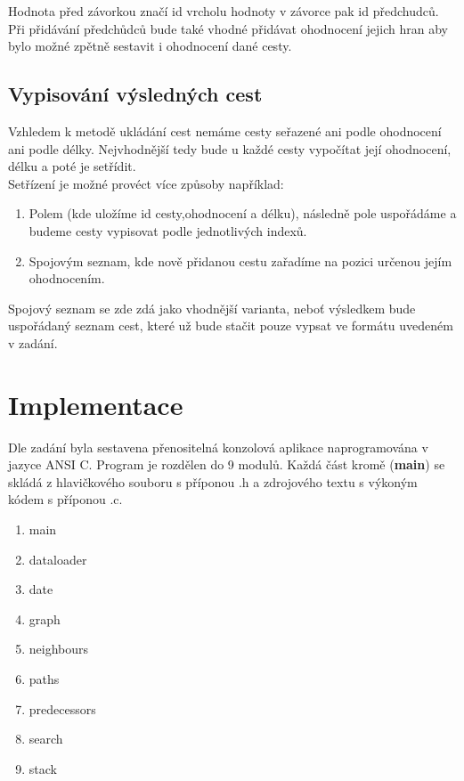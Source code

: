   Hodnota před závorkou značí id vrcholu hodnoty v závorce pak id předchudců.
  Při přidávání předchůdců bude také vhodné přidávat ohodnocení jejich hran aby bylo možné zpětně sestavit i ohodnocení dané cesty.
  
  \section{Vypisování výsledných cest}
  Vzhledem k metodě ukládání cest nemáme cesty seřazené ani podle ohodnocení ani podle délky. Nejvhodnější tedy bude u každé cesty vypočítat její ohodnocení, délku a poté je setřídit.\\
  
  Setřízení je možné provéct více způsoby například:
  
  \begin{enumerate}
  	\item Polem (kde uložíme id cesty,ohodnocení a délku), následně pole uspořádáme a budeme cesty vypisovat podle jednotlivých indexů.
  	\item Spojovým seznam, kde nově přidanou cestu zařadíme na pozici určenou jejím ohodnocením.
  \end{enumerate}

	Spojový seznam se zde zdá jako vhodnější varianta, neboť výsledkem bude uspořádaný seznam cest, které už bude stačit pouze vypsat ve formátu uvedeném v zadání.

\chapter{Implementace}
Dle zadání byla sestavena přenositelná konzolová aplikace naprogramována v jazyce ANSI C. Program je rozdělen do 9 modulů. Každá část kromě (\textbf{main}) se skládá z hlavičkového souboru s příponou .h a zdrojového textu s výkoným kódem s příponou .c.

\begin{enumerate}
	\item main
	\item dataloader
	\item date
	\item graph
	\item neighbours
	\item paths
	\item predecessors
	\item search
	\item stack
\end{enumerate}


